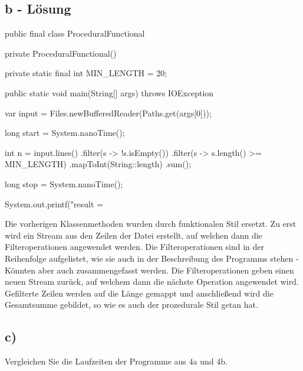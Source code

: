 \subsection*{b - Lösung}
\newline
\begin{code}[language=java, caption={Funktionale Methoden}, label={lst:Aufgabe4b}]
public final class ProceduralFunctional {
    private ProceduralFunctional() { }

    private static final int MIN_LENGTH = 20;

    public static void main(String[] args) throws IOException {
        var input = Files.newBufferedReader(Paths.get(args[0]));

        long start = System.nanoTime();

        int n = input.lines()
                .filter(s -> !s.isEmpty())
                .filter(s -> s.length() >= MIN_LENGTH)
                .mapToInt(String::length)
                .sum();

        long stop = System.nanoTime();

        System.out.printf("result = %
    }
}
\end{code}
\newline
Die vorherigen Klassenmethoden wurden durch funktionalen Stil ersetzt.
Zu erst wird ein Stream aus den Zeilen der Datei erstellt,
auf welchen dann die Filteroperationen angewendet werden.
Die Filteroperationen sind in der Reihenfolge aufgelistet, wie sie auch in der Beschreibung des Programms stehen
- Könnten aber auch zusammengefasst werden.
Die Filteroperationen geben einen neuen Stream zurück, auf welchem dann die nächste Operation angewendet wird.
Gefilterte Zeilen werden auf die Länge gemappt und anschließend wird die Gesamtsumme gebildet,
 so wie es auch der prozedurale Stil getan hat.
\newline

\subsection*{c)}
Vergleichen Sie die Laufzeiten der Programme aus 4a und 4b.
\newline
